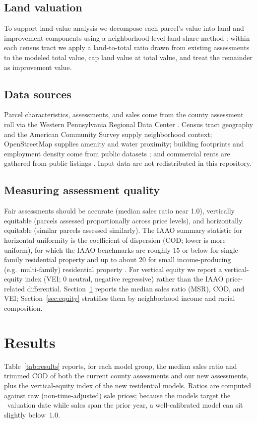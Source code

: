 \documentclass[11pt]{article}
\begin{document}
\subsection{Land valuation}
To support land-value analysis we decompose each parcel's value into land and
improvement components using a neighborhood-level land-share method
\citep{doucet_land}: within each census tract we apply a land-to-total ratio drawn
from existing assessments to the modeled total value, cap land value at total
value, and treat the remainder as improvement value.

\subsection{Data sources}
Parcel characteristics, assessments, and sales come from the county assessment
roll via the Western Pennsylvania Regional Data Center \citep{wprdc}. Census tract
geography and the American Community Survey supply neighborhood context;
OpenStreetMap supplies amenity and water proximity; building footprints and
employment density come from public datasets \citep{sardari2025,census_lodes}; and
commercial rents are gathered from public listings \citep{loopnet}. Input data are
not redistributed in this repository.

\subsection{Measuring assessment quality}
Fair assessments should be accurate (median sales ratio near 1.0), vertically
equitable (parcels assessed proportionally across price levels), and
horizontally equitable (similar parcels assessed similarly). The IAAO summary
statistic for horizontal uniformity is the coefficient of dispersion (COD; lower
is more uniform), for which the IAAO benchmarks are roughly 15 or below for
single-family residential property and up to about 20 for small income-producing
(e.g.\ multi-family) residential property \citep{iaao_ratio}. For vertical equity
we report a vertical-equity index (VEI; 0 neutral, negative regressive) rather
than the IAAO price-related differential. Section~\ref{sec:results} reports the
median sales ratio (MSR), COD, and VEI; Section~\ref{sec:equity} stratifies them
by neighborhood income and racial composition.

\section{Results}\label{sec:results}
Table~\ref{tab:results} reports, for each model group, the median sales ratio and
trimmed COD of both the current county assessments and our new assessments, plus
the vertical-equity index of the new residential models. Ratios are computed
against raw (non-time-adjusted) sale prices; because the models target the
\valuationDate\ valuation date while sales span the prior year, a well-calibrated
model can sit slightly below~1.0.
\end{document}

